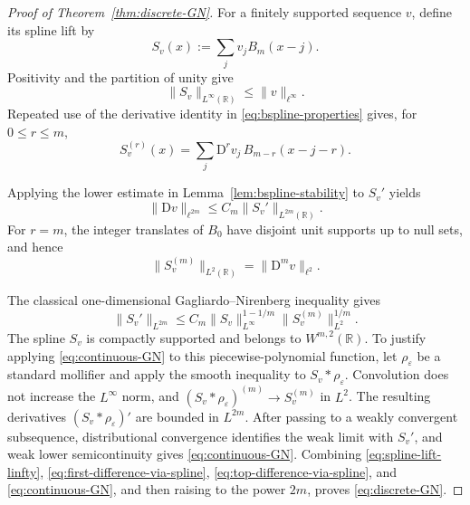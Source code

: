 \documentclass[11pt]{amsart}
\theoremstyle{plain}
\theoremstyle{definition}
\theoremstyle{remark}
\numberwithin{equation}{section}
\theoremstyle{plain}
\begin{document}
\begin{proof}[Proof of Theorem~\ref{thm:discrete-GN}]
	For a finitely supported sequence $v$, define its spline lift by
	\begin{equation}\label{eq:spline-lift}
		S_v(x):=\sum_jv_jB_m(x-j).
	\end{equation}
	Positivity and the partition of unity give
	\begin{equation}\label{eq:spline-lift-linfty}
		\|S_v\|_{L^\infty(\mathbb R)}
		\le\|v\|_{\ell^\infty}.
	\end{equation}
	Repeated use of the derivative identity in
	\eqref{eq:bspline-properties} gives, for $0\le r\le m$,
	\begin{equation}\label{eq:spline-derivative-difference}
		S_v^{(r)}(x)
		=\sum_j\mathrm D^rv_j\,B_{m-r}(x-j-r).
	\end{equation}
	
	Applying the lower estimate in Lemma~\ref{lem:bspline-stability} to
	$S_v'$ yields
	\begin{equation}\label{eq:first-difference-via-spline}
		\|\mathrm Dv\|_{\ell^{2m}}
		\le C_m\|S_v'\|_{L^{2m}(\mathbb R)}.
	\end{equation}
	For $r=m$, the integer translates of $B_0$ have disjoint unit
	supports up to null sets, and hence
	\begin{equation}\label{eq:top-difference-via-spline}
		\|S_v^{(m)}\|_{L^2(\mathbb R)}
		=\|\mathrm D^mv\|_{\ell^2}.
	\end{equation}
	
	The classical one-dimensional Gagliardo--Nirenberg inequality
	\cite{Nirenberg} gives
	\begin{equation}\label{eq:continuous-GN}
		\|S_v'\|_{L^{2m}}
		\le C_m\|S_v\|_{L^\infty}^{1-1/m}
		\|S_v^{(m)}\|_{L^2}^{1/m}.
	\end{equation}
	The spline $S_v$ is compactly supported and belongs to
	$W^{m,2}(\mathbb R)$.  To justify applying
	\eqref{eq:continuous-GN} to this piecewise-polynomial function, let
	$\rho_\varepsilon$ be a standard mollifier and apply the smooth inequality
	to $S_v*\rho_\varepsilon$.  Convolution does not increase the
	$L^\infty$ norm, and
	$(S_v*\rho_\varepsilon)^{(m)}\to S_v^{(m)}$ in $L^2$.  The resulting
	derivatives $(S_v*\rho_\varepsilon)'$ are bounded in $L^{2m}$.
	After passing to a weakly convergent subsequence, distributional convergence
	identifies the weak limit with $S_v'$, and weak lower semicontinuity gives
	\eqref{eq:continuous-GN}. 
	Combining \eqref{eq:spline-lift-linfty},
	\eqref{eq:first-difference-via-spline},
	\eqref{eq:top-difference-via-spline}, and \eqref{eq:continuous-GN}, and then
	raising to the power $2m$, proves \eqref{eq:discrete-GN}.
\end{proof}
\end{document}
